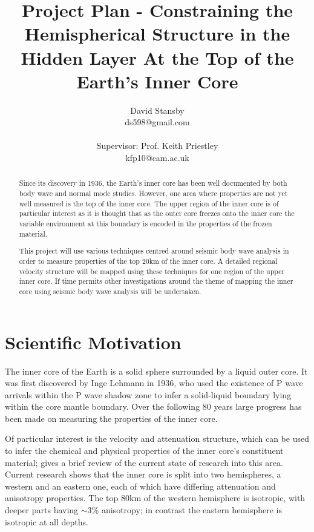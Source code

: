 \documentclass[11pt,a4paper]{article}
\begin{document}
\title{Project Plan - Constraining the Hemispherical Structure in the Hidden Layer At the Top of the Earth's Inner Core}
\author{David Stansby \\ ds598@gmail.com \\  \\ Supervisor: Prof. Keith Priestley \\ kfp10@cam.ac.uk }
\maketitle

\begin{abstract}
Since its discovery in 1936, the Earth's inner core has been well documented by both body wave and normal mode studies. However, one area where properties are not yet well measured is the top of the inner core. The upper region of the inner core is of particular interest as it is thought that as the outer core freezes onto the inner core the variable environment at this boundary is encoded in the properties of the frozen material. 

This project will use various techniques centred around seismic body wave analysis in order to measure properties of the top 20km of the inner core.  A detailed regional velocity structure will be mapped using these techniques for one region of the upper inner core. If time permits other investigations around the theme of mapping the inner core using seismic body wave analysis will be undertaken.
\end{abstract}

\section{Scientific Motivation}
The inner core of the Earth is a solid sphere surrounded by a liquid outer core. It was first discovered by Inge Lehmann in 1936, who used the existence of P wave arrivals within the P wave shadow zone to infer a solid-liquid boundary lying within the core mantle boundary. Over the following 80 years large progress has been made on measuring the properties of the inner core.

Of particular interest is the velocity and attenuation structure, which can be used to infer the chemical and physical properties of the inner core's constituent material; \cite{Deuss2014} gives a brief review of the current state of research into this area. Current research shows that the inner core is split into two hemispheres, a western and an eastern one, each of which have differing attenuation and anisotropy properties. The top 80km of the western hemisphere is isotropic, with deeper parts having $\sim 3\% $ anisotropy; in contrast the eastern hemisphere is isotropic at all depths.
\end{document}
